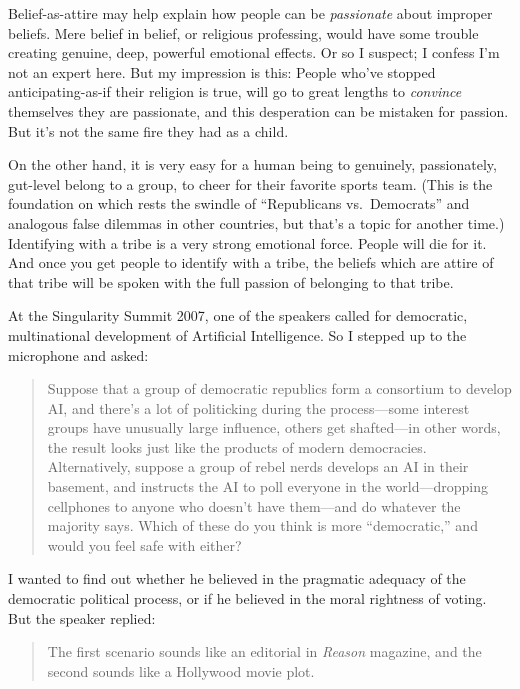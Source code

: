 {
 Belief-as-attire may help explain how people can be
\textit{passionate} about improper beliefs. Mere belief in belief, or
religious professing, would have some trouble creating genuine, deep,
powerful emotional effects. Or so I suspect; I confess
I'm not an expert here. But my impression is this:
People who've stopped anticipating-as-if their religion
is true, will go to great lengths to \textit{convince} themselves they
are passionate, and this desperation can be mistaken for passion. But
it's not the same fire they had as a child.}

{
 On the other hand, it is very easy for a human being to genuinely,
passionately, gut-level belong to a group, to cheer for their favorite
sports team. (This is the foundation on which rests the swindle of
``Republicans vs.\ Democrats'' and
analogous false dilemmas in other countries, but that's
a topic for another time.) Identifying with a tribe is a very strong
emotional force. People will die for it. And once you get people to
identify with a tribe, the beliefs which are attire of that tribe will
be spoken with the full passion of belonging to that tribe.}

\myendsectiontext

\label{applause_lights}

{
 At the Singularity Summit 2007, one of the speakers called for
democratic, multinational development of Artificial Intelligence. So I
stepped up to the microphone and asked:}

\begin{quote}
{
 Suppose that a group of democratic republics form a consortium to
develop AI, and there's a lot of politicking during the
process---some interest groups have unusually large influence, others
get shafted---in other words, the result looks just like the products
of modern democracies. Alternatively, suppose a group of rebel nerds
develops an AI in their basement, and instructs the AI to poll everyone
in the world---dropping cellphones to anyone who
doesn't have them---and do whatever the majority says.
Which of these do you think is more
``democratic,'' and would you feel
safe with either?}
\end{quote}

{
 I wanted to find out whether he believed in the pragmatic adequacy
of the democratic political process, or if he believed in the moral
rightness of voting. But the speaker replied:}

\begin{quote}
{
 The first scenario sounds like an editorial in \textit{Reason}
 magazine, and the second sounds like a Hollywood movie plot.}
\end{quote}


